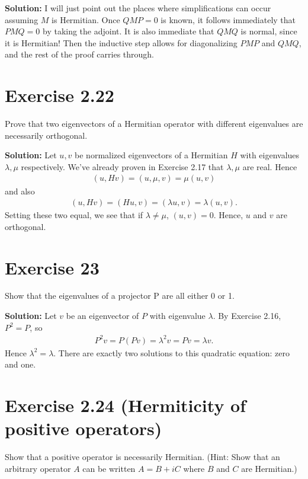 \documentclass{book}
\begin{document}
    \textbf{Solution:} I will just point out the places where simplifications can occur assuming $M$ is Hermitian. Once $QMP = 0$ is known, it follows immediately that $PMQ = 0$ by taking the adjoint. It is also immediate that $QMQ$ is normal, since it is Hermitian! Then the inductive step allows for diagonalizing $PMP$ and $QMQ$, and the rest of the proof carries through. 
    
\section*{Exercise 2.22}
    Prove that two eigenvectors of a Hermitian operator with different eigenvalues are necessarily orthogonal.
    
    \textbf{Solution:} Let $u, v$ be normalized eigenvectors of a Hermitian $H$ with eigenvalues $\lambda, \mu$ respectively. We've already proven in Exercise 2.17 that $\lambda, \mu$ are real. Hence
    \begin{align}
        (u, Hv) = (u, \mu, v) = \mu (u,v)
    \end{align}
    and also
    \begin{align}
        (u, Hv) = (H u, v) = (\lambda u, v) = \lambda (u,v).
    \end{align}
    Setting these two equal, we see that if $\lambda \neq \mu$, $(u,v) = 0$. Hence, $u$ and $v$ are orthogonal.
    
\section*{Exercise 23}
    Show that the eigenvalues of a projector P are all either 0 or 1.
    
    \textbf{Solution:} Let $v$ be an eigenvector of $P$ with eigenvalue $\lambda$. By Exercise 2.16, $P^2 = P$, so
    \begin{align}
        P^2 v = P (Pv) = \lambda^2 v = P v = \lambda v.
    \end{align}
    Hence $\lambda^2 = \lambda$. There are exactly two solutions to this quadratic equation: zero and one.
    
\section*{Exercise 2.24 (Hermiticity of positive operators)}
    Show that a positive operator is necessarily Hermitian. (Hint: Show that an arbitrary operator $A$ can be written $A = B + iC$ where $B$ and $C$ are Hermitian.)
    
\end{document}

